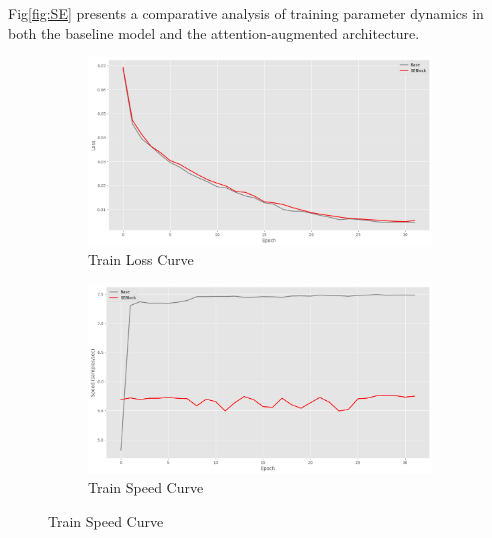 \documentclass[conference]{IEEEtran}
\begin{document}
Fig\ref{fig:SE} presents a comparative analysis of training parameter dynamics in both the baseline model and the attention-augmented architecture.
\begin{figure}[htbp]
    \centering
    \begin{subfigure}[b]{0.24\textwidth}
        \centering
        \includegraphics[width=\textwidth]{figure/SE_train_loss.png}
        \caption{Train Loss Curve}
        \label{fig:sub1-SE}
    \end{subfigure}
    \begin{subfigure}[b]{0.24\textwidth}
        \centering
        \includegraphics[width=\textwidth]{figure/SE_train_speed.png}
        \caption{Train Speed Curve}
        \label{fig:sub2-SE}
    \end{subfigure}

    \vspace{0.01em} %


\end{figure}
\end{document}
